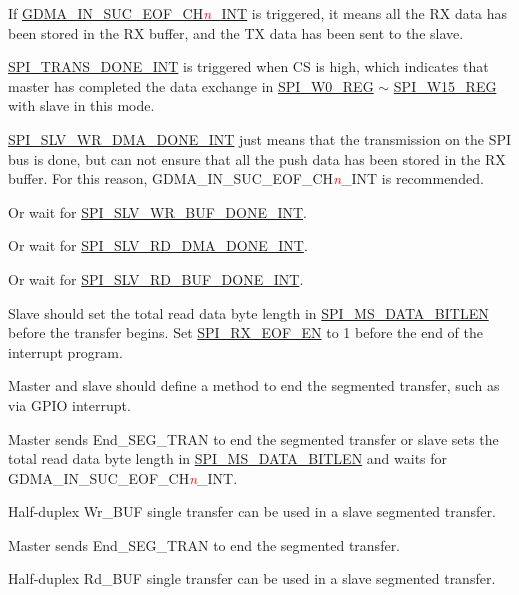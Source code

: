 \documentclass[main\_\_EN.tex]{subfiles}
\begin{document}
\begin{ThreePartTable}

\begin{TableNotes}
    \item[1] If \hyperref[int:GDMAINSUCEOFINT]{GDMA\_IN\_SUC\_EOF\_CH\textcolor{red}{\it{n}}\_INT} is triggered, it means all the RX data has been stored in the RX buffer, and the TX data has been sent to the slave.
    \item[2] \hyperref[int:SPITRANSDONEINT]{SPI\_TRANS\_DONE\_INT} is triggered when CS is high, which indicates that master has completed the data exchange in \hyperref[regdesc:SPIW0REG]{SPI\_W0\_REG} $\sim$ \hyperref[regdesc:SPIW15REG]{SPI\_W15\_REG} with slave in this mode.
    \item[3] \hyperref[int:SPISLVWRDMADONEINT]{SPI\_SLV\_WR\_DMA\_DONE\_INT} just means that the transmission on the SPI bus is done, but can not ensure that all the push data has been stored in the RX buffer. For this reason, GDMA\_IN\_SUC\_EOF\_CH\textcolor{red}{\it{n}}\_INT is recommended.
    \item[4] Or wait for \hyperref[int:SPISLVWRBUFDONEINT]{SPI\_SLV\_WR\_BUF\_DONE\_INT}.
    \item[5] Or wait for \hyperref[int:SPISLVRDDMADONEINT]{SPI\_SLV\_RD\_DMA\_DONE\_INT}.
    \item[6] Or wait for \hyperref[int:SPISLVRDBUFDONEINT]{SPI\_SLV\_RD\_BUF\_DONE\_INT}.
    \item[7] Slave should set the total read data byte length in \hyperref[fielddesc:SPIMSDATABITLEN]{SPI\_MS\_DATA\_BITLEN} before the transfer begins. Set \hyperref[fielddesc:SPIRXEOFEN]{SPI\_RX\_EOF\_EN} to 1 before the end of the interrupt program.
    \item[8] Master and slave should define a method to end the segmented transfer, such as via GPIO interrupt.
    \item[9] Master sends End\_SEG\_TRAN to end the segmented transfer or slave sets the total read data byte length in \hyperref[fielddesc:SPIMSDATABITLEN]{SPI\_MS\_DATA\_BITLEN} and waits for GDMA\_IN\_SUC\_EOF\_CH\textcolor{red}{\it{n}}\_INT.
    \item[10] Half-duplex Wr\_BUF single transfer can be used in a slave segmented transfer.
    \item[11] Master sends End\_SEG\_TRAN to end the segmented transfer.
    \item[12] Half-duplex Rd\_BUF single transfer can be used in a slave segmented transfer.
\end{TableNotes}


\end{ThreePartTable}
\end{document}
